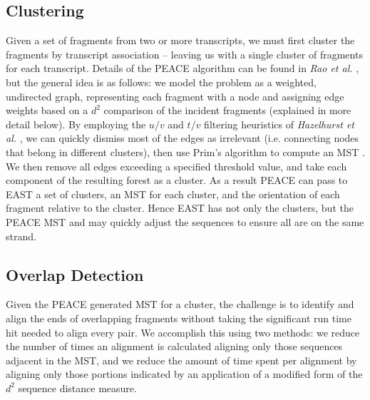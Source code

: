 \documentclass[10pt]{bmc_article}
\newcommand{\peace} {{\small PEACE}}
\newcommand{\east} {{\small EAST}}
\newenvironment{bmcformat}{\begin{raggedright}\baselineskip20pt\sloppy\setboolean{publ}{false}}{\end{raggedright}\baselineskip20pt\sloppy}
\begin{document}
\begin{bmcformat}
\subsection*{Clustering}

Given a set of fragments from two or more transcripts, we must first
cluster the fragments by transcript association -- leaving us with a
single cluster of fragments for each transcript.  Details of the
\peace\/ algorithm can be found in {\it Rao et al.} \cite{Rao10}, but
the general idea is as follows: we model the problem as a weighted,
undirected graph, representing each fragment with a node and assigning
edge weights based on a $d^2$ comparison of the incident fragments
(explained in more detail below).  By employing the $u/v$ and $t/v$
filtering heuristics of {\it Hazelhurst et al.} \cite{Hazelhurst08}, we
can quickly dismiss most of the edges as irrelevant (i.e. connecting
nodes that belong in different clusters), then use Prim's algorithm to
compute an MST \cite{Prim57}.  We then remove all
edges exceeding a specified threshold value, and take each component
of the resulting forest as a cluster.  As a result \peace\/ can pass
to \east\/ a set of clusters, an MST for each cluster, and the
orientation of each fragment relative to the cluster.  Hence \east\/
has not only the clusters, but the \peace\/ MST and may quickly adjust
the sequences to ensure all are on the same strand.

\subsection*{Overlap Detection}

Given the \peace\/ generated MST for a cluster, the challenge is to
identify and align the ends of overlapping fragments without taking
the significant run time hit needed to align every pair.  We
accomplish this using two methods: we reduce the number of times an
alignment is calculated aligning only those sequences adjacent in the
MST, and we reduce the amount of  time spent per alignment by aligning
only those portions indicated by an application of a modified form of
the $d^2$ sequence distance measure.


\end{bmcformat}
\end{document}
